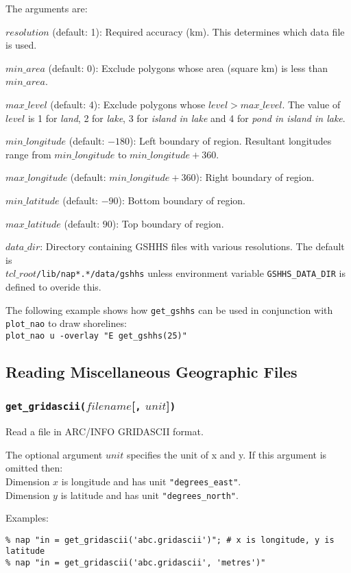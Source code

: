 The arguments are:
\begin{simpleitems}
\item $\mathit{resolution}$ (default: 1):
    Required accuracy (km).
    This determines which data file is used.
\item $\mathit{min\_area}$ (default: 0):
    Exclude polygons whose area (square km) is less than $\mathit{min\_area}$.
\item $\mathit{max\_level}$ (default: 4):
    Exclude polygons whose $\mathit{level} > \mathit{max\_level}$.
    The value of $\mathit{level}$ is
    1 for \emph{land},
    2 for \emph{lake},
    3 for \emph{island in lake}
    and
    4 for \emph{pond in island in lake}.
\item $\mathit{min\_longitude}$ (default: $-180$):
    Left boundary of region. Resultant longitudes range from 
    $\mathit{min\_longitude}$ to $\mathit{min\_longitude + 360}$.
\item $\mathit{max\_longitude}$ (default: $\mathit{min\_longitude + 360}$):
    Right boundary of region.
\item $\mathit{min\_latitude}$ (default: $-90$):
    Bottom boundary of region.
\item $\mathit{max\_latitude}$ (default: $90$):
    Top boundary of region.
\item $\mathit{data\_dir}$:
    Directory containing GSHHS files with various resolutions. The default is
    \\
    $\mathit{tcl\_root}$\texttt{/lib/nap*.*/data/gshhs}
     unless environment variable
    \texttt{GSHHS\_DATA\_DIR}
     is defined to overide this.
\end{simpleitems}

The following example shows how \texttt{get\_gshhs}
can be used in conjunction with \texttt{plot\_nao} to draw shorelines:
\\
\texttt{plot\_nao u -overlay "E get\_gshhs(25)"}

\subsection{Reading Miscellaneous Geographic Files}
    \label{geog-Reading}

\subsubsection{\texttt{get\_gridascii(}$\mathit{filename}$[\texttt{,} $\mathit{unit}$]\texttt{)}}
    \label{geog-get-gridascii}

Read a file in ARC/INFO GRIDASCII format.
  
 The optional argument 
  $unit$ specifies the unit of x and y. If this argument is
  omitted then:
  \\Dimension 
  $x$ is longitude and has unit 
  \texttt{"degrees\_east"}.
  \\Dimension 
  $y$ is latitude and has unit 
  \texttt{"degrees\_north"}.
  
 Examples:
  \begin{verbatim}
% nap "in = get_gridascii('abc.gridascii')"; # x is longitude, y is latitude
% nap "in = get_gridascii('abc.gridascii', 'metres')"
\end{verbatim}

